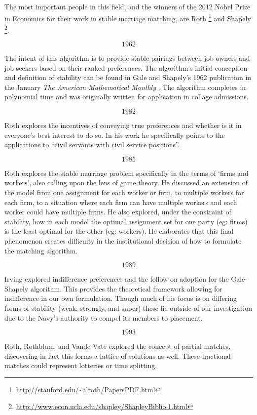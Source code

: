 The most important people in this field, and the winners of the 2012 Nobel Prize in Economics for their work in stable marriage matching, are Roth \footnote{\url{http://stanford.edu/~alroth/PapersPDF.html}} and Shapely \footnote{\url{http://www.econ.ucla.edu/shapley/ShapleyBiblio.1.html}}.

\[1962\]

The intent of this algorithm is to provide stable pairings between job owners and job seekers based on their ranked preferences. The algorithm's initial conception and definition of stability can be found in Gale and Shapely's 1962 publication in the January \textit{The American Mathematical Monthly} \cite{gale_shapely}. The algorithm completes in polynomial time and was originally written for application in collage admissions.

\[1982\]

Roth explores the incentives of conveying true preferences and whether is it in everyone's best interest to do so. \cite{incentives} In his work he specifically points to the applications to ``civil servants with civil service positions''.

\[1985\]

Roth explores the stable marriage problem specifically in the terms of `firms and workers', also calling upon the lens of game theory.\cite{game} He discussed an extension of the model from one assignment for each worker or firm, to multiple workers for each firm, to a situation where each firm can have multiple workers and each worker could have multiple firms. He also explored, under the constraint of stability, how in each model the optimal assignment set for one party (eg: firms) is the least optimal for the other (eg: workers). He elaborates that this final phenomenon creates difficulty in the institutional decision of how to formulate the matching algorithm.

\[1989\]

Irving explored indifference preferences and the follow on adoption for the Gale-Shapely algorithm. \cite{indifference} This provides the theoretical framework allowing for indifference in our own formulation. Though much of his focus is on differing forms of stability (weak, strongly, and super) these lie outside of our investigation due to the Navy's authority to compel its members to placement.

\[1993\]

Roth, Rothblum, and Vande Vate explored the concept of partial matches, discovering in fact this forms a lattice of solutions as well. These fractional matches could represent lotteries or time splitting. \cite{partial}


